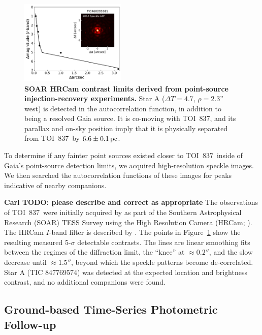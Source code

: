 \documentclass[12pt,twocolumn,tighten]{aastex62}
\newcommand{\tn}{TOI~837} %
\begin{document}
\begin{figure}[t]
	\begin{center}
		\leavevmode
		\includegraphics[width=0.45\textwidth]{f6.pdf}
	\end{center}
	\vspace{-0.7cm}
	\caption{ 
    {\bf SOAR HRCam contrast limits derived from point-source
    injection-recovery experiments.} Star A ($\Delta T=4.7$,
    $\rho=2.3$'' west) is detected in the autocorrelation function, in
    addition to being a resolved Gaia source.  It is co-moving with
    \tn, and its parallax and on-sky position imply that it is
    physically separated from \tn\ by $6.6\pm 0.1\,{\rm pc}$.
		\label{fig:soar}
	}
\end{figure}

To determine if any fainter point sources existed closer to \tn\
inside of Gaia's point-source detection limits, we acquired
high-resolution speckle images. We then searched the autocorrelation
functions of these images for peaks indicative of nearby companions.

{\bf Carl TODO: please describe and correct as appropriate}
The observations of \tn\ were initially acquired by
\citet{ziegler_soar_2020} as part of the Southern Astrophysical
Research (SOAR) TESS Survey using the High Resolution Camera (HRCam;
\citealt{tokovinin_ten_2018}).  The HRCam $I$-band filter is described
by \citet{tokovinin_ten_2018}.  The points in Figure~\ref{fig:soar}
show the resulting measured 5-$\sigma$ detectable contrasts.  The
lines are linear smoothing fits between the regimes of the diffraction
limit, the ``knee'' at $\approx 0.2''$, and the slow decrease until
$\approx 1.5''$, beyond which the speckle patterns become
de-correlated.  Star A (TIC 847769574) was detected at the expected
location and brightness contrast, and no additional companions were
found.



\subsection{Ground-based Time-Series Photometric Follow-up}
\label{subsec:groundphot}
\end{document}
